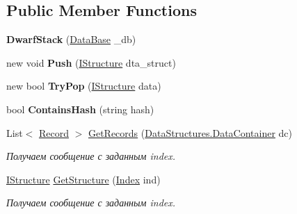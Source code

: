 \subsection*{Public Member Functions}
\begin{DoxyCompactItemize}
\item 
\hypertarget{class_dwarf_d_b_1_1_stack_1_1_dwarf_stack_ad48677010f3ce3899b9467616fd9a7ee}{
{\bfseries DwarfStack} (\hyperlink{class_dwarf_d_b_1_1_data_structures_1_1_data_base}{DataBase} \_\-db)}
\label{class_dwarf_d_b_1_1_stack_1_1_dwarf_stack_ad48677010f3ce3899b9467616fd9a7ee}

\item 
\hypertarget{class_dwarf_d_b_1_1_stack_1_1_dwarf_stack_a885ad9cdfe63a8f8d5c55ffda79b075f}{
new void {\bfseries Push} (\hyperlink{interface_dwarf_d_b_1_1_data_structures_1_1_i_structure}{IStructure} dta\_\-struct)}
\label{class_dwarf_d_b_1_1_stack_1_1_dwarf_stack_a885ad9cdfe63a8f8d5c55ffda79b075f}

\item 
\hypertarget{class_dwarf_d_b_1_1_stack_1_1_dwarf_stack_a4b56dab4ce355bf6b5d85861d75a3ca8}{
new bool {\bfseries TryPop} (\hyperlink{interface_dwarf_d_b_1_1_data_structures_1_1_i_structure}{IStructure} data)}
\label{class_dwarf_d_b_1_1_stack_1_1_dwarf_stack_a4b56dab4ce355bf6b5d85861d75a3ca8}

\item 
\hypertarget{class_dwarf_d_b_1_1_stack_1_1_dwarf_stack_ad9a9e05a598682086956db2bfaba217a}{
bool {\bfseries ContainsHash} (string hash)}
\label{class_dwarf_d_b_1_1_stack_1_1_dwarf_stack_ad9a9e05a598682086956db2bfaba217a}

\item 
List$<$ \hyperlink{class_dwarf_d_b_1_1_data_structures_1_1_record}{Record} $>$ \hyperlink{class_dwarf_d_b_1_1_stack_1_1_dwarf_stack_adca3ef11aa4b86f2f6de7f33e06bb13c}{GetRecords} (\hyperlink{class_dwarf_d_b_1_1_data_structures_1_1_data_container}{DataStructures.DataContainer} dc)
\begin{DoxyCompactList}\small\item\em Получаем сообщение с заданным index. \item\end{DoxyCompactList}\item 
\hyperlink{interface_dwarf_d_b_1_1_data_structures_1_1_i_structure}{IStructure} \hyperlink{class_dwarf_d_b_1_1_stack_1_1_dwarf_stack_a1cf7979ccc18a74d5a2ff3e0205ca2c7}{GetStructure} (\hyperlink{class_dwarf_d_b_1_1_data_structures_1_1_index}{Index} ind)
\begin{DoxyCompactList}\small\item\em Получаем сообщение с заданным index. \item\end{DoxyCompactList}\end{DoxyCompactItemize}
